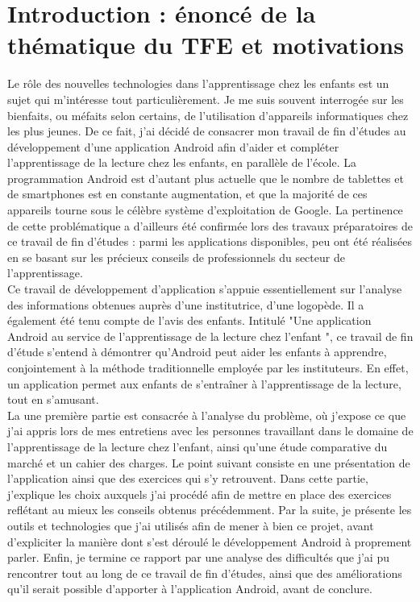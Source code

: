 \section{Introduction : énoncé de la thématique du TFE et motivations}
Le rôle des nouvelles technologies dans l'apprentissage chez les enfants est un sujet qui m'intéresse tout particulièrement. Je me suis souvent interrogée sur les bienfaits, ou méfaits selon certains, de l'utilisation d'appareils informatiques chez les plus jeunes. De ce fait, j'ai décidé de consacrer mon travail de fin d'études au développement d'une application Android afin d'aider et compléter l'apprentissage de la lecture chez les enfants, en parallèle de l'école. La programmation Android est d'autant plus actuelle que le nombre de tablettes et de smartphones est en constante augmentation, et que la majorité de ces appareils tourne sous le célèbre système d'exploitation de Google. La pertinence de cette problématique a d'ailleurs été confirmée lors des travaux préparatoires de ce travail de fin d'études : parmi les applications disponibles, peu ont été réalisées en se basant sur les précieux conseils de professionnels du secteur de l'apprentissage.\\

Ce travail de développement d'application s'appuie essentiellement sur l'analyse des informations obtenues auprès d'une institutrice, d'une logopède. Il a également été tenu compte de l'avis des enfants. Intitulé "Une application Android au service de l'apprentissage de la lecture chez l'enfant ", ce travail de fin d'étude s'entend à démontrer qu'Android peut aider les enfants à apprendre, conjointement à la méthode traditionnelle employée par les instituteurs. En effet, un application permet aux enfants de s'entraîner à l'apprentissage de la lecture, tout en s'amusant.\\

La une première partie est consacrée à l'analyse du problème, où j'expose ce que j'ai appris lors de mes entretiens avec les personnes travaillant dans le domaine de l'apprentissage de la lecture chez l'enfant, ainsi qu'une étude comparative du marché et un cahier des charges. Le point suivant consiste en une présentation de l'application ainsi que des exercices qui s'y retrouvent. Dans cette partie, j'explique les choix auxquels j'ai procédé afin de mettre en place des exercices reflétant au mieux les conseils obtenus précédemment. Par la suite, je présente les outils et technologies que j'ai utilisés afin de mener à bien ce projet, avant d'expliciter la manière dont s'est déroulé le développement Android à proprement parler. Enfin, je termine ce rapport par une analyse des difficultés que j'ai pu rencontrer tout au long de ce travail de fin d'études, ainsi que des améliorations qu'il serait possible d'apporter à l'application Android, avant de conclure.